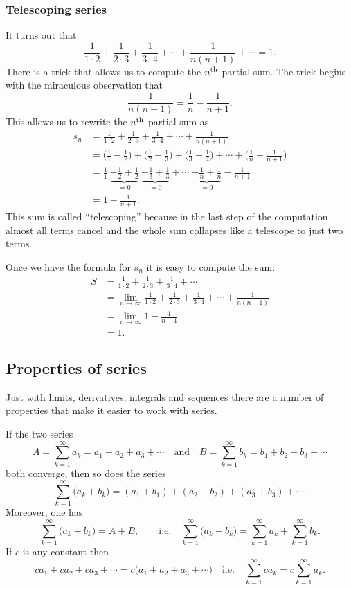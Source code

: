 \subsubsection*{Telescoping series}  It turns out that
\[
  \frac{1}{1\cdot2} + \frac{1}{2\cdot 3} + \frac{1}{3\cdot 4} + \cdots
  +\frac{1}{n(n+1)}+ \cdots =1.
\]
There is a trick that allows us to compute the $n^{\rm th}$
partial sum.  The trick begins with the miraculous observation that
\[
  \frac{1}{n(n+1)} = \frac{1}{n} - \frac{1}{n+1}. 
\]
This allows us to rewrite the $n^{\rm th}$ partial sum as
\begin{align*}
  s_n 
  & = \frac{1}{1\cdot2} + \frac{1}{2\cdot 3} + \frac{1}{3\cdot 4} + \cdots +\frac{1}{n(n+1)}\\
  & = \bigl(\frac11 - \frac12\bigr) + \bigl(\frac12 - \frac13\bigr) + \bigl(\frac13 - \frac14\bigr) + \cdots + \bigl(\frac1n - \frac1{n+1}\bigr) \\
  &= \frac 11 ~ \underbrace{-\frac12+\frac12}_{=0} ~ \underbrace{-\frac13+\frac13}_{=0} +\cdots ~\underbrace{-\frac1n+\frac1n}_{=0} -\frac1{n+1}\\
  &= 1 - \frac1{n+1}.
\end{align*}
This sum is called ``telescoping'' because in the last step of the computation almost all terms cancel and the whole sum collapses like a telescope
to just two terms.

Once we have the formula for $s_n$ it is easy to compute the sum:
\begin{align*}
  S &= \frac{1}{1\cdot2} + \frac{1}{2\cdot 3} + \frac{1}{3\cdot 4} + \cdots \\
  &= \lim_{n\to\infty} \frac{1}{1\cdot2} + \frac{1}{2\cdot 3} + \frac{1}{3\cdot
  4} + \cdots + \frac1{n(n+1)} \\
  &= \lim_{n\to\infty} 1- \frac{1}{n+1}\\
  &= 1.
\end{align*}


\subsection{Properties of series} %
Just with limits, derivatives, integrals and sequences there are a number of
properties that make it easier to work with series.
\begin{theorem}
  If the two series 
  \[
    A= \sum _{k=1}^\infty a_k = a_1+a_2+a_3+\cdots \quad \text{and} \quad 
    B= \sum _{k=1}^\infty b_k = b_1+b_2+b_3+\cdots 
  \]
  both converge, then so does the series
  \[
    \sum_{k=1}^{\infty} \bigl( a_k+b_k \bigr)
    = (a_1+b_1) + (a_2+b_2) + (a_3+b_3) + \cdots.
  \]
  Moreover, one has
  \begin{equation}
    \sum_{k=1}^{\infty} \bigl( a_k+b_k \bigr) = A + B,\qquad \text{i.e.}\quad
    \sum_{k=1}^{\infty} \bigl( a_k+b_k \bigr)
    = \sum_{k=1}^{\infty} a_k  +  \sum_{k=1}^{\infty} b_k .
    \label{eq:sum-of-series-is-series-of-sums}
  \end{equation}
  If $c$ is any constant then
  \[
     ca_1 + ca_2 + ca_3 + \cdots = c \bigl(a_1+a_2+a_3+\cdots\bigr)
     \quad\text{i.e.}\quad
     \sum_{k=1}^\infty ca_k = c\sum_{k=1}^\infty a_k.
  \]
\end{theorem}

